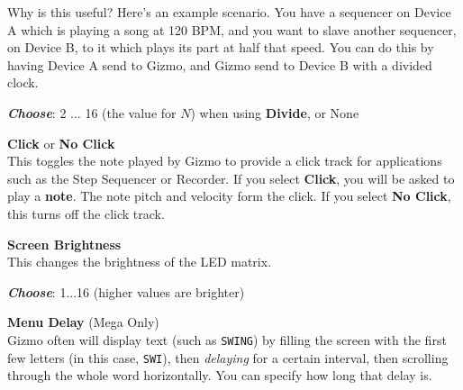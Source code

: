\documentclass{article}
\begin{document}
\begin{description}
Why is this useful?  Here's an example scenario.  You have a sequencer on Device A which is playing a song at 120 BPM, and you want to slave another sequencer, on Device B, to it which plays its part at half that speed.  You can do this by having Device A send to Gizmo, and Gizmo send to Device B with a divided clock.

			\begin{description}
					\item{\bf \textit{Choose}}: 2 ... 16 (the value for \(N\)) when using {\bf Divide}, or None\hspace{1.45in}
			\end{description}

		
	\item{\bf Click} or {\bf No Click}\\
		This toggles the note played by Gizmo to provide a click track for applications such as the Step Sequencer or Recorder.  If you select {\bf Click}, you will be asked to play a {\bf note}.  The note pitch and velocity form the click.  If you select {\bf No Click}, this turns off the click track.
		
\hspace{\fill}\vspace{-1.5em}

	\item{\bf Screen Brightness}\\
		This changes the brightness of the LED matrix.
		\begin{description}
		\item{\bf \textit{Choose}}: 1...16 (higher values are brighter)
		\end{description}
		
		
	\item{\bf  Menu Delay} (Mega Only)\\
		Gizmo often will display text (such as \texttt{SWING}) by filling the screen with the first few letters (in this case, \texttt{SWI}), then {\it delaying} for a certain interval, then scrolling through the whole word horizontally. You can specify how long that delay is.
	

\end{description}
\end{document}
